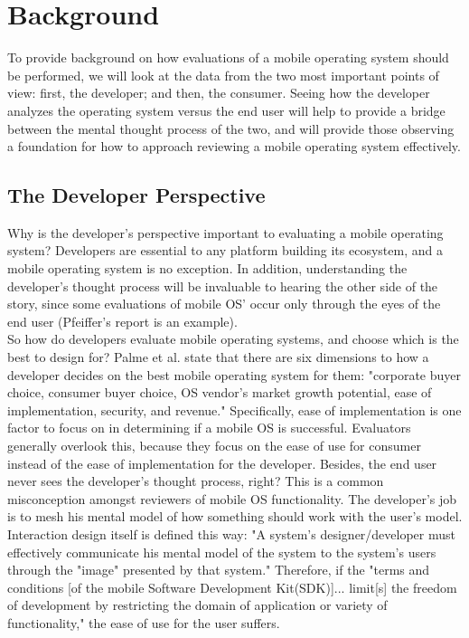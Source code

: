 \documentclass[11pt]{article}
\begin{document}
\section{Background}
To provide background on how evaluations of a mobile operating system should be performed, we will look at the data from the two most important points of view: first, the developer; and then, the consumer. Seeing how the developer analyzes the operating system versus the end user will help to provide a bridge between the mental thought process of the two, and will provide those observing a foundation for how to approach reviewing a mobile operating system effectively.
\subsection{The Developer Perspective}
Why is the developer's perspective important to evaluating a mobile operating system? Developers are essential to any platform building its ecosystem, and a mobile operating system is no exception. In addition, understanding the developer's thought process will be invaluable to hearing the other side of the story, since some evaluations of mobile OS' occur only through the eyes of the end user (Pfeiffer's report is an example). \\
\indent So how do developers evaluate mobile operating systems, and choose which is the best to design for? Palme et al. state that there are six dimensions to how a developer decides on the best mobile operating system for them: "corporate buyer choice, consumer buyer choice, OS vendor's market growth potential, ease of implementation, security, and revenue." \cite{Palme} Specifically, ease of implementation is one factor to focus on in determining if a mobile OS is successful. Evaluators generally overlook this, because they focus on the ease of use for consumer instead of the ease of implementation for the developer. Besides, the end user never sees the developer's thought process, right? This is a common misconception amongst reviewers of mobile OS functionality. The developer's job is to mesh his mental model of how something should work with the user's model. Interaction design itself is defined this way: "A system's designer/developer must effectively communicate his mental model of the system to the system's users through the "image" presented by that system." Therefore, if the "terms and 
conditions [of the mobile Software Development Kit(SDK)]... limit[s] the freedom of development by restricting the domain of application or variety of functionality," the ease of use for the user suffers. 
\end{document}
